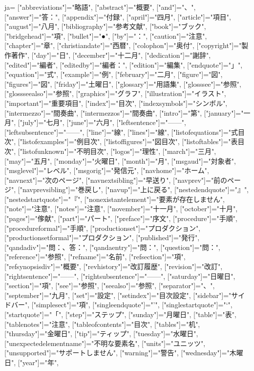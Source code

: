 ja={
 ["abbreviations"]="略語",
 ["abstract"]="概要",
 ["and"]="、",
 ["answer"]="答：",
 ["appendix"]="付録",
 ["april"]="四月",
 ["article"]="項目",
 ["august"]="八月",
 ["bibliography"]="参考文献",
 ["book"]="ブック",
 ["bridgehead"]="項",
 ["bullet"]="●",
 ["by"]="：",
 ["caution"]="注意",
 ["chapter"]="章",
 ["christiandate"]="西暦",
 ["colophon"]="奥付",
 ["copyright"]="製作著作",
 ["day"]="日",
 ["december"]="十二月",
 ["dedication"]="謝辞",
 ["edited"]="編者",
 ["editedby"]="編者：",
 ["edition"]="編集",
 ["endquote"]="」",
 ["equation"]="式",
 ["example"]="例",
 ["february"]="二月",
 ["figure"]="図",
 ["figures"]="図",
 ["friday"]="土曜日",
 ["glossary"]="用語集",
 ["glosssee"]="参照",
 ["glossseealso"]="参照",
 ["graphics"]="グラフ",
 ["illustration"]="イラスト",
 ["important"]="重要項目",
 ["index"]="目次",
 ["indexsymbols"]="シンボル",
 ["intermezzo"]="間奏曲",
 ["intermezzos"]="間奏曲",
 ["intro"]="第",
 ["january"]="一月",
 ["july"]="七月",
 ["june"]="六月",
 ["leftsentence"]="——",
 ["leftsubsentence"]="——",
 ["line"]="線",
 ["lines"]="線",
 ["listofequations"]="式目次",
 ["listofexamples"]="例目次",
 ["listoffigures"]="図目次",
 ["listoftables"]="表目次",
 ["listofunknown"]="不明目次",
 ["logos"]="理性",
 ["march"]="三月",
 ["may"]="五月",
 ["monday"]="火曜日",
 ["month"]="月",
 ["msgaud"]="対象者",
 ["msglevel"]="レベル",
 ["msgorig"]="発信元",
 ["navhome"]="ホーム",
 ["navnext"]="次のページ",
 ["navnextsibling"]="早送り",
 ["navprev"]="前のページ",
 ["navprevsibling"]="巻戻し",
 ["navup"]="上に戻る",
 ["nestedendquote"]="』",
 ["nestedstartquote"]="『",
 ["nonexistantelement"]="要素が存在しません",
 ["note"]="注意",
 ["notes"]="注意",
 ["november"]="十一月",
 ["october"]="十月",
 ["pages"]="偧献",
 ["part"]="パート",
 ["preface"]="序文",
 ["procedure"]="手順",
 ["procedureformal"]="手順",
 ["productionset"]="プロダクション",
 ["productionsetformal"]="プロダクション",
 ["published"]="発行",
 ["qandadiv"]="問：、答：",
 ["qandaentry"]="問：",
 ["question"]="問：",
 ["reference"]="参照",
 ["refname"]="名前",
 ["refsection"]="項",
 ["refsynopsisdiv"]="概要",
 ["revhistory"]="改訂履歴",
 ["revision"]="改訂",
 ["rightsentence"]="——",
 ["rightsubsentence"]="——",
 ["saturday"]="日曜日",
 ["section"]="項",
 ["see"]="参照",
 ["seealso"]="参照",
 ["separator"]="、",
 ["september"]="九月",
 ["set"]="設定",
 ["setindex"]="目次設定",
 ["sidebar"]="サイドバー",
 ["simplesect"]="項",
 ["singleendquote"]="’",
 ["singlestartquote"]="‘",
 ["startquote"]="「",
 ["step"]="ステップ",
 ["sunday"]="月曜日",
 ["table"]="表",
 ["tablenotes"]="注意",
 ["tableofcontents"]="目次",
 ["tables"]="机",
 ["thursday"]="金曜日",
 ["tip"]="ティップ",
 ["tuesday"]="水曜日",
 ["unexpectedelementname"]="不明な要素名",
 ["units"]="ユニッツ",
 ["unsupported"]="サポートしません",
 ["warning"]="警告",
 ["wednesday"]="木曜日",
 ["year"]="年",
}
